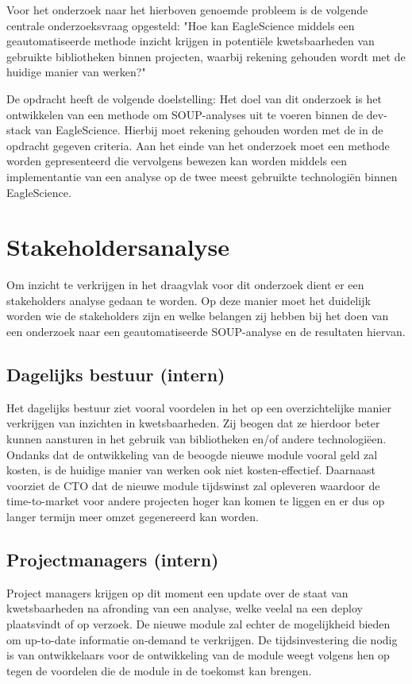 Voor het onderzoek naar het hierboven genoemde probleem is de volgende centrale onderzoeksvraag opgesteld: "Hoe kan EagleScience middels een geautomatiseerde methode inzicht krijgen in potentiële kwetsbaarheden van gebruikte bibliotheken binnen projecten, waarbij rekening gehouden wordt met de huidige manier van werken?"

De opdracht heeft de volgende doelstelling:
Het doel van dit onderzoek is het ontwikkelen van een methode om SOUP-analyses uit te voeren binnen de dev-stack van EagleScience. Hierbij moet rekening gehouden worden met de in de opdracht gegeven criteria. Aan het einde van het onderzoek moet een methode worden gepresenteerd die vervolgens bewezen kan worden middels een implementantie van een analyse op de twee meest gebruikte technologiën binnen EagleScience.


\section{Stakeholdersanalyse}\label{sec:stakeholdersanalyse}
Om inzicht te verkrijgen in het draagvlak voor dit onderzoek dient er een stakeholders analyse gedaan te worden. Op deze manier moet het duidelijk worden wie de stakeholders zijn en welke belangen zij hebben bij het doen van een onderzoek naar een geautomatiseerde SOUP-analyse en de resultaten hiervan.

\subsection{Dagelijks bestuur (intern)}\label{subsec:dagelijks-bestuur-(intern)1}
Het dagelijks bestuur ziet vooral voordelen in het op een overzichtelijke manier verkrijgen van inzichten in kwetsbaarheden. Zij beogen dat ze hierdoor beter kunnen aansturen in het gebruik van bibliotheken en/of andere technologiëen. Ondanks dat de ontwikkeling van de beoogde nieuwe module vooral geld zal kosten, is de huidige manier van werken ook niet kosten-effectief. Daarnaast voorziet de CTO dat de nieuwe module tijdswinst zal opleveren waardoor de time-to-market voor andere projecten hoger kan komen te liggen en er dus op langer termijn meer omzet gegenereerd kan worden.

\subsection{Projectmanagers (intern)}\label{subsec:projectmanagers-(intern)1}
Project managers krijgen op dit moment een update over de staat van kwetsbaarheden na afronding van een analyse, welke veelal na een deploy plaatsvindt of op verzoek. De nieuwe module zal echter de mogelijkheid bieden om up-to-date informatie on-demand te verkrijgen.
De tijdsinvestering die nodig is van ontwikkelaars voor de ontwikkeling van de module weegt volgens hen op tegen de voordelen die de module in de toekomst kan brengen.

